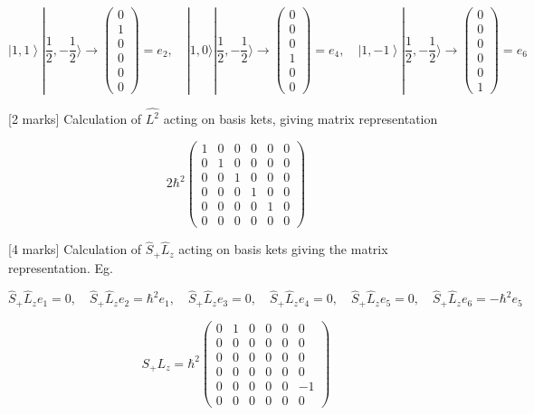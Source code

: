 \[
 \left|1, 1 \right> |\frac{1}{2},-\frac{1}{2} \rangle \rightarrow \begin{pmatrix} 0\\ 1\\ 0\\ 0\\ 0\\ 0 \end{pmatrix} = e_2, \quad |1, 0 \rangle |\frac{1}{2}, -\frac{1}{2} \rangle \rightarrow \begin{pmatrix} 0\\ 0\\ 0\\ 1\\ 0\\ 0 \end{pmatrix} = e_4, \quad \left|1, -1 \right>|\frac{1}{2}, -\frac{1}{2} \rangle \rightarrow \begin{pmatrix} 0\\ 0\\ 0\\ 0\\ 0\\ 1 \end{pmatrix} = e_6
\]

[2 marks] Calculation of  \( \hat{L^{2}} \) acting on basis kets, giving matrix representation 

\[ 
2\hbar^2 \begin{pmatrix} 1 & 0 & 0 & 0 & 0 & 0\\  0 & 1 & 0 & 0 & 0 & 0\\ 0 & 0 & 1 & 0 & 0 & 0\\ 0 & 0 & 0 & 1 & 0 & 0\\ 0 & 0 & 0 & 0 & 1 & 0\\ 0 & 0 & 0 & 0 & 0 & 0 \end{pmatrix}
\]

[4 marks] Calculation of \( \hat{S}_{+}\hat{L}_{z} \) acting on basis kets giving the matrix representation. Eg. 

\[
\hat{S}_{+}\hat{L}_{z}e_1 = 0, \quad \hat{S}_{+}\hat{L}_{z}e_2 = \hbar^2e_1, \quad \hat{S}_{+}\hat{L}_{z}e_3 = 0, \quad \hat{S}_{+}\hat{L}_{z}e_4 = 0, \quad \hat{S}_{+}\hat{L}_{z}e_5 = 0, \quad \hat{S}_{+}\hat{L}_{z}e_6 = -\hbar^2e_5 
\]

\[ 
S_{+}L_{z} = \hbar^2 \begin{pmatrix} 0 & 1 & 0 & 0 & 0 & 0\\ 0 & 0 & 0 & 0 & 0 & 0\\ 0 & 0 & 0 & 0 & 0 & 0\\ 0 & 0 & 0 & 0 & 0 & 0\\ 0 & 0 & 0 & 0 & 0 & -1\\ 0 & 0 & 0 & 0 & 0 & 0 \end{pmatrix}
\]

